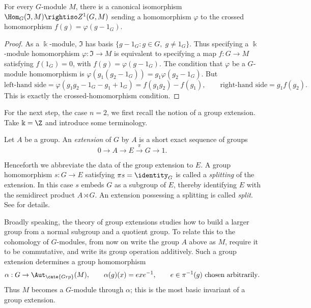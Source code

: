 \begin{proposition}\label{prop:crossed-augmentation}
	For every $G$-module $M$, there is a canonical isomorphism
	$\Hom_G(\mathfrak{I},M)\rightiso Z^1(G,M)$ sending a homomorphism
	$\varphi$ to the crossed homomorphism $f(g)=\varphi(g-1_G)$.
\end{proposition}
\begin{proof}
	As a $\Bbbk$-module, $\mathfrak{I}$ has basis
	$\{g-1_G:g\in G,\;g\neq1_G\}$. Thus specifying a $\Bbbk$-module
	homomorphism $\varphi:\mathfrak{I}\to M$ is equivalent to specifying a
	map $f:G\to M$ satisfying $f(1_G)=0$, with
	$f(g)=\varphi(g-1_G)$. The condition that $\varphi$ be a $G$-module
	homomorphism is
	$\varphi(g_1(g_2-1_G))=g_1\varphi(g_2-1_G)$. But
	\[ \text{left-hand side}=\varphi(g_1g_2-1_G-g_1+1_G)
	=f(g_1g_2)-f(g_1),\qquad
	\text{right-hand side}=g_1f(g_2). \]
	This is exactly the crossed-homomorphism condition.
\end{proof}

For the next step, the case $n=2$, we first recall the notion of a group
extension. Take $\Bbbk=\Z$ and introduce some terminology.

\begin{definition}\label{def:group-ext}
	Let $A$ be a group. An \emph{extension} of $G$ by $A$ is a short exact
	sequence of groups \cite[Definition 4.3.7]{Li1}
	\[ 0\to A\to E\xrightarrow{\pi}G\to1. \]

	Henceforth we abbreviate the data of the group extension to $E$. A group
	homomorphism $s:G\to E$ satisfying $\pi s=\identity_G$ is called a
	\emph{splitting} of the extension. In this case $s$ embeds $G$ as a
	subgroup of $E$, thereby identifying $E$ with the semidirect product
	$A\rtimes G$. An extension possessing a splitting is called
	\emph{split}. See \cite[\S 4.3]{Li1} for details.
\end{definition}

Broadly speaking, the theory of group extensions studies how to build a larger
group from a normal subgroup and a quotient group. To relate this to the
cohomology of $G$-modules, from now on write the group $A$ above as $M$,
require it to be commutative, and write its group operation additively. Such a
group extension determines a group homomorphism
\[ \alpha:G\to\Aut_{\cate{Grp}}(M),\qquad
	\alpha(g)(x)=exe^{-1},\qquad e\in\pi^{-1}(g)\ \text{chosen arbitrarily}. \]
Thus $M$ becomes a $G$-module through $\alpha$; this is the most basic
invariant of a group extension.

